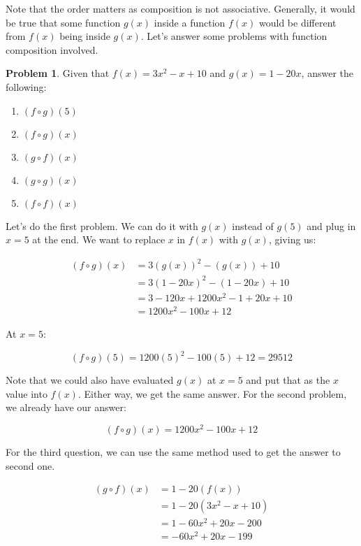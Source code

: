 \documentclass[12pt]{article}
\theoremstyle{definition}
\newtheorem{problem}{Problem}
\begin{document}
Note that the order matters as composition is not associative.
Generally, it would be true that some function $g(x)$ inside a function $f(x)$ would be different from $f(x)$ being inside $g(x)$.
Let's answer some problems with function composition involved.

\begin{problem}
Given that $f(x) = 3x^2 - x + 10$ and $g(x) = 1 - 20x$, answer the following:

\begin{enumerate}
    \item $(f \circ g)(5)$
    \item $(f \circ g)(x)$
    \item $(g \circ f)(x)$
    \item $(g \circ g)(x)$
    \item $(f \circ f)(x)$
\end{enumerate}
\end{problem}


Let's do the first problem. We can do it with $g(x)$ instead of $g(5)$ and plug in $x=5$ at the end.
We want to replace $x$ in $f(x)$ with $g(x)$, giving us:

\begin{align}
    (f \circ g)(x) & = 3(g(x))^2 - (g(x)) + 10           \\
                   & = 3(1 - 20x)^2 - (1 - 20x) + 10     \\
                   & = 3 - 120x + 1200x^2 - 1 + 20x + 10 \\
                   & = 1200x^2 - 100x + 12
\end{align}

At $x=5$:

\begin{equation}
    (f \circ g)(5) = 1200(5)^2 - 100(5) + 12 = 29512
\end{equation}

Note that we could also have evaluated $g(x)$ at $x=5$ and put that as the $x$ value into $f(x)$.
Either way, we get the same answer.
For the second problem, we already have our answer:

\begin{equation}
    (f \circ g)(x) = 1200x^2 - 100x + 12
\end{equation}

For the third question, we can use the same method used to get the answer to second one.

\begin{align}
    (g \circ f)(x) & = 1 - 20(f(x))          \\
                   & = 1 - 20(3x^2 - x + 10) \\
                   & = 1 - 60x^2 + 20x - 200 \\
                   & = -60x^2 + 20x - 199
\end{align}
\end{document}
